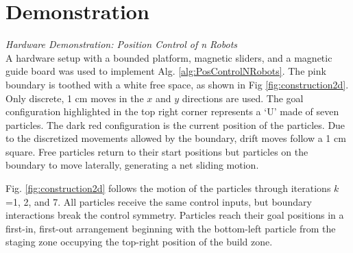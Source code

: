 
\section{Demonstration}\label{sec:expResults}

\emph{Hardware Demonstration: Position Control of n Robots}\\
A hardware setup with a bounded platform, magnetic sliders, and a magnetic guide board was used to implement  Alg. \ref{alg:PosControlNRobots}. 
  The pink boundary is toothed with a white free space, as shown in Fig \ref{fig:construction2d}.
    Only discrete, 1 cm moves in the $x$ and $y$ directions are used. The goal configuration highlighted in the top right corner represents a `U' made of seven particles. The dark red configuration is the current position of the particles. 
Due to the discretized movements allowed by the boundary, drift moves follow a 1 cm square.  Free particles return to their start positions but particles on the boundary to move laterally, generating a net sliding motion.

Fig. \ref{fig:construction2d} follows the motion of the particles through iterations  $k$=1, 2, and 7. All particles receive the same control inputs, but boundary interactions break the control symmetry.  Particles reach their goal positions in a first-in, first-out arrangement beginning with the bottom-left particle from the staging zone occupying the top-right position of the build zone.


